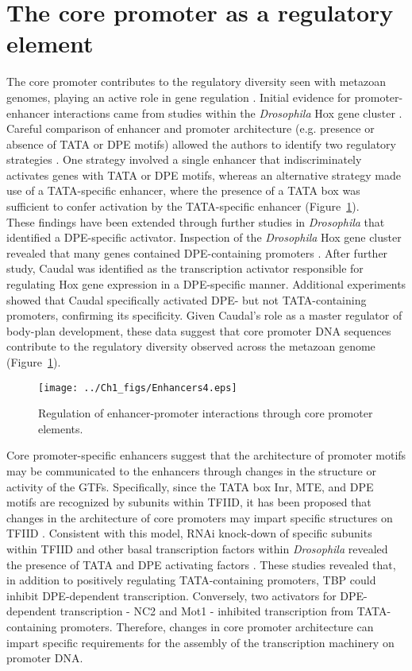 \section{The core promoter as a regulatory element}

The core promoter contributes to the regulatory diversity seen with metazoan genomes, playing an active role in gene regulation \cite{Juven-Gershon_468}. Initial evidence for promoter-enhancer interactions came from studies within the \emph{Drosophila} Hox gene cluster \cite{Ohtsuki_2485}. Careful comparison of enhancer and promoter architecture (e.g. presence or absence of TATA or DPE motifs) allowed the authors to identify two regulatory strategies \cite{Ohtsuki_2485}.  One strategy involved a single enhancer that indiscriminately activates genes with TATA or DPE motifs, whereas an alternative strategy made use of a TATA-specific enhancer, where the presence of a TATA box was sufficient to confer activation by the TATA-specific enhancer (Figure~\ref{fig:Enhancers}). \\
\indent These findings have been extended through further studies in \emph{Drosophila} that identified a DPE-specific activator. Inspection of the \emph{Drosophila} Hox gene cluster revealed that many genes contained DPE-containing promoters \cite{Juven-Gershon_776}. After further study, Caudal was identified as the transcription activator responsible for regulating Hox gene expression in a DPE-specific manner. Additional experiments showed that Caudal specifically activated DPE- but not TATA-containing promoters, confirming its specificity. Given Caudal's role as a master regulator of body-plan development, these data suggest that core promoter DNA sequences contribute to the regulatory diversity observed across the metazoan genome (Figure~\ref{fig:Enhancers}).\\ 
\begin{figure}
\centering
\texttt{[image: ../Ch1\_figs/Enhancers4.eps]}
\caption[Regulation of enhancer-promoter interactions through core promoter elements]{Regulation of enhancer-promoter interactions through core promoter elements.}
\label{fig:Enhancers}
\end{figure}
\indent Core promoter-specific enhancers suggest that the architecture of promoter motifs may be communicated to the enhancers through changes in the structure or activity of the GTFs. Specifically, since the TATA box Inr, MTE, and DPE motifs are recognized by subunits within TFIID, it has been proposed that changes in the architecture of core promoters may impart specific structures on TFIID \cite{Ohtsuki_2485}. Consistent with this model, RNAi knock-down of specific subunits within TFIID and other basal transcription factors within \emph{Drosophila} revealed the presence of TATA and DPE activating factors \cite{Hsu_811}. These studies revealed that, in addition to positively regulating TATA-containing promoters, TBP could inhibit DPE-dependent transcription.  Conversely, two activators for DPE-dependent transcription - NC2 and Mot1 - inhibited transcription from TATA-containing promoters. Therefore, changes in core promoter architecture can impart specific requirements for the assembly of the transcription machinery on promoter DNA. \\


